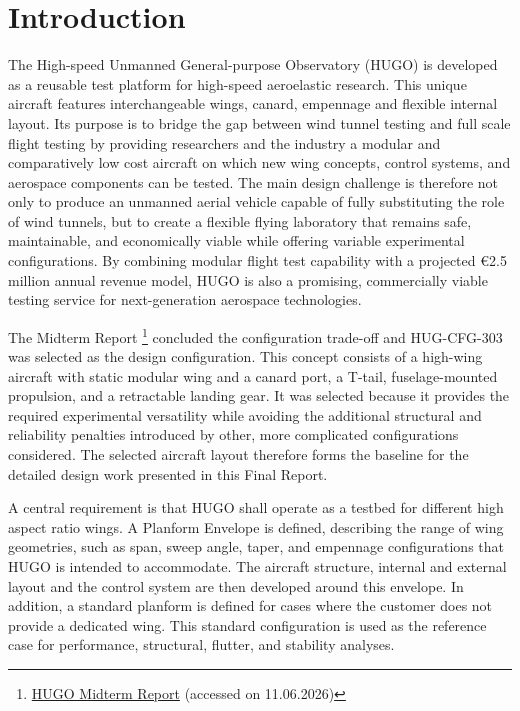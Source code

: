 \chapter{Introduction}
\label{ch:introduction}

The High-speed Unmanned General-purpose Observatory (HUGO) is developed as a reusable test platform for high-speed aeroelastic research. This unique aircraft features interchangeable wings, canard, empennage and flexible internal layout. Its purpose is to bridge the gap between wind tunnel testing and full scale flight testing by providing researchers and the industry a modular and comparatively low cost aircraft on which new wing concepts, control systems, and aerospace components can be tested. The main design challenge is therefore not only to produce an unmanned aerial vehicle capable of fully substituting the role of wind tunnels, but to create a flexible flying laboratory that remains safe, maintainable, and economically viable while offering variable experimental configurations. By combining modular flight test capability with a projected €2.5 million annual revenue model, HUGO is also a promising, commercially viable testing service for next-generation aerospace technologies.

The Midterm Report \footnote{\href{https://github.com/Teo-Cokonaj/DSE-28/blob/main/docs/Projects/28_HUGO_Midterm_Report_final.pdf}{HUGO Midterm Report} (accessed on 11.06.2026)} concluded the configuration trade-off and HUG-CFG-303 was selected as the design configuration. This concept consists of a high-wing aircraft with static modular wing and a canard port, a T-tail, fuselage-mounted propulsion, and a retractable landing gear. It was selected because it provides the required experimental versatility while avoiding the additional structural and reliability penalties introduced by other, more complicated configurations considered. The selected aircraft layout therefore forms the baseline for the detailed design work presented in this Final Report.

A central requirement is that HUGO shall operate as a testbed for different high aspect ratio wings.  A Planform Envelope is defined, describing the range of wing geometries, such as span, sweep angle, taper, and empennage configurations that HUGO is intended to accommodate. The aircraft structure, internal and external layout and the control system are then developed around this envelope. In addition, a standard planform is defined for cases where the customer does not provide a dedicated wing. This standard configuration is used as the reference case for performance, structural, flutter, and stability analyses.

